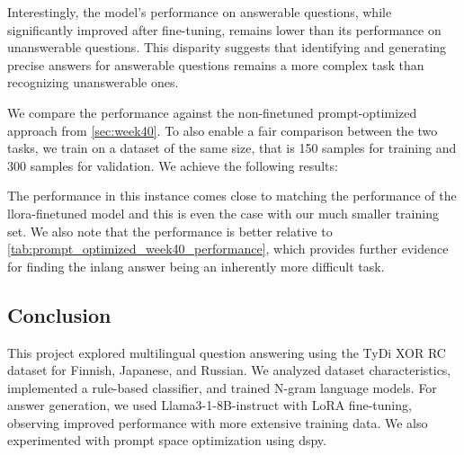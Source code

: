 \documentclass[11pt]{article}
\begin{document}
Interestingly, the model's performance on answerable questions, while significantly improved after fine-tuning, remains lower than its performance on unanswerable questions. 
This disparity suggests that identifying and generating precise answers for answerable questions remains a more complex task than recognizing unanswerable ones.

We compare the performance against the non-finetuned prompt-optimized approach from \ref{sec:week40}.
To also enable a fair comparison between the two tasks, we train on a dataset of the same size, that is 150 samples for training and 300 samples for validation.
We achieve the following results:


\begin{table}[ht]
    \centering
    \caption{Performance comparison of F1 Score and Exact Match optimized models for QA on 'answer' field}
    \label{tab:prompt_optimized_week41_performance}
\end{table}

The performance in this instance comes close to matching the performance of the llora-finetuned model and this is even the case with our much smaller training set.
We also note that the performance is better relative to \ref{tab:prompt_optimized_week40_performance}, which provides further evidence for finding the inlang answer being an inherently more difficult task.
\subsection{Conclusion}

This project explored multilingual question answering using the TyDi XOR RC dataset for Finnish, Japanese, and Russian. We analyzed dataset characteristics, implemented a rule-based classifier, and trained N-gram language models. For answer generation, we used Llama3-1-8B-instruct with LoRA fine-tuning, observing improved performance with more extensive training data. We also experimented with prompt space optimization using dspy.
\end{document}
